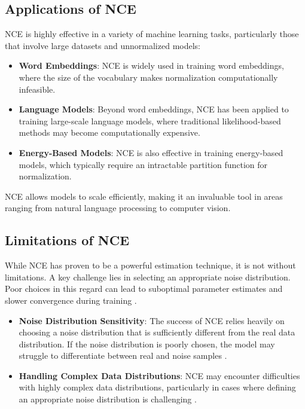 \subsection{Applications of NCE}

NCE is highly effective in a variety of machine learning tasks, particularly those that involve large datasets and unnormalized models:
\begin{itemize}
    \item \textbf{Word Embeddings}: NCE is widely used in training word embeddings, where the size of the vocabulary makes normalization computationally infeasible.
    \item \textbf{Language Models}: Beyond word embeddings, NCE has been applied to training large-scale language models, where traditional likelihood-based methods may become computationally expensive.
    \item \textbf{Energy-Based Models}: NCE is also effective in training energy-based models, which typically require an intractable partition function for normalization.
\end{itemize}

NCE allows models to scale efficiently, making it an invaluable tool in areas ranging from natural language processing to computer vision.

\subsection{Limitations of NCE}

While NCE has proven to be a powerful estimation technique, it is not without limitations. A key challenge lies in selecting an appropriate noise distribution. Poor choices in this regard can lead to suboptimal parameter estimates and slower convergence during training \citep{10.48550/arxiv.2110.11271}.

\begin{itemize}
    \item \textbf{Noise Distribution Sensitivity}: The success of NCE relies heavily on choosing a noise distribution that is sufficiently different from the real data distribution. If the noise distribution is poorly chosen, the model may struggle to differentiate between real and noise samples \citep{10.48550/arxiv.2110.11271}.
    \item \textbf{Handling Complex Data Distributions}: NCE may encounter difficulties with highly complex data distributions, particularly in cases where defining an appropriate noise distribution is challenging \citep{10.48550/arxiv.2110.11271}.
\end{itemize}


